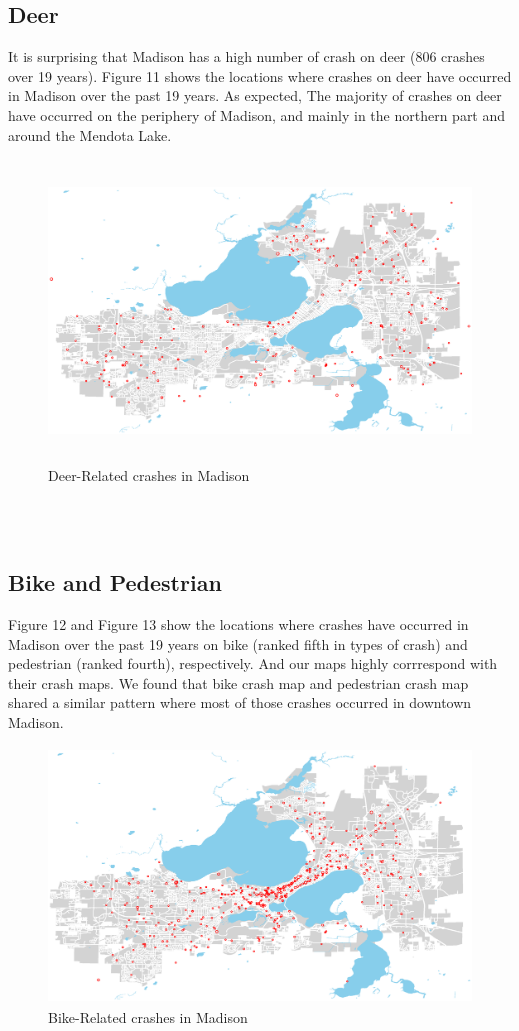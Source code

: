 \documentclass[15pt]{article}
\begin{document}
\subsection{Deer}
It is surprising that Madison has a high number of crash on deer (806 crashes over 19 years). Figure 11 shows the locations where crashes on deer have occurred in Madison over the past 19 years. As expected, The majority of crashes on deer have occurred on the periphery of Madison, and mainly in the northern part and around the Mendota Lake.
\begin{figure}[H]
\raggedleft
\includegraphics[height=80mm]{deer.eps}
\caption{Deer-Related crashes in Madison}
\end{figure}

~\\
~\\
\subsection{Bike and Pedestrian}
Figure 12 and Figure 13 show the locations where crashes have occurred in Madison over the past 19 years on bike (ranked fifth in types of crash) and pedestrian (ranked fourth), respectively. And our maps highly corrrespond with their crash maps. We found that bike crash map and pedestrian crash map shared a similar pattern where most of those crashes occurred in downtown Madison.
\begin{figure}[H]
\raggedleft
\includegraphics[height=68mm]{bike.eps}
\caption{Bike-Related crashes in Madison}
\end{figure}
\end{document}
